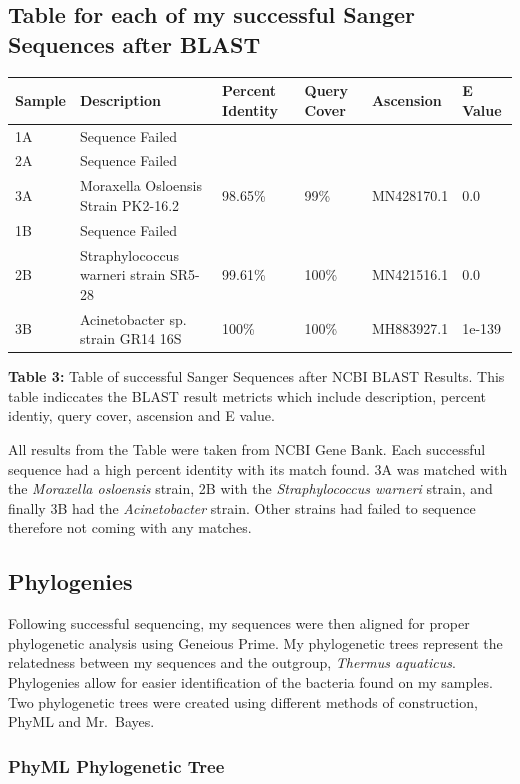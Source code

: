 \documentclass[]{article}
\begin{document}
\hypertarget{table-for-each-of-my-successful-sanger-sequences-after-blast}{%
\subsection{Table for each of my successful Sanger Sequences after
BLAST}\label{table-for-each-of-my-successful-sanger-sequences-after-blast}}

\begin{longtable}[]{@{}llllll@{}}
\toprule
Sample & Description & Percent Identity & Query Cover & Ascension & E
Value\tabularnewline
\midrule
\endhead
1A & Sequence Failed & & & &\tabularnewline
2A & Sequence Failed & & & &\tabularnewline
3A & Moraxella Osloensis Strain PK2-16.2 & 98.65\% & 99\% & MN428170.1 &
0.0\tabularnewline
1B & Sequence Failed & & & &\tabularnewline
2B & Straphylococcus warneri strain SR5-28 & 99.61\% & 100\% &
MN421516.1 & 0.0\tabularnewline
3B & Acinetobacter sp. strain GR14 16S & 100\% & 100\% & MH883927.1 &
1e-139\tabularnewline
\bottomrule
\end{longtable}

\textbf{Table 3:} Table of successful Sanger Sequences after NCBI BLAST
Results. This table indiccates the BLAST result metricts which include
description, percent identiy, query cover, ascension and E value.

All results from the Table were taken from NCBI Gene Bank. Each
successful sequence had a high percent identity with its match found. 3A
was matched with the \emph{Moraxella osloensis} strain, 2B with the
\emph{Straphylococcus warneri} strain, and finally 3B had the
\emph{Acinetobacter} strain. Other strains had failed to sequence
therefore not coming with any matches.

\hypertarget{phylogenies}{%
\subsection{Phylogenies}\label{phylogenies}}

Following successful sequencing, my sequences were then aligned for
proper phylogenetic analysis using Geneious Prime. My phylogenetic trees
represent the relatedness between my sequences and the outgroup,
\emph{Thermus aquaticus}. Phylogenies allow for easier identification of
the bacteria found on my samples. Two phylogenetic trees were created
using different methods of construction, PhyML and Mr.~Bayes.

\hypertarget{phyml-phylogenetic-tree}{%
\subsubsection{PhyML Phylogenetic Tree}\label{phyml-phylogenetic-tree}}
\end{document}
